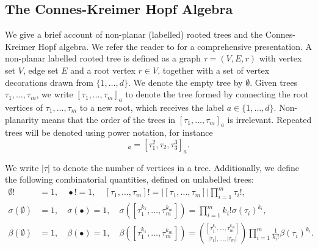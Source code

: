 \documentclass{article} %
\theoremstyle{definition}
\theoremstyle{remark}
\begin{document}
\subsection{The Connes-Kreimer Hopf Algebra}

We give a brief account of non-planar (labelled) rooted trees and the Connes-Kreimer Hopf algebra. We refer the reader to \cite{hoffman2003hopf} for a comprehensive presentation. A non-planar labelled rooted tree is defined as a graph $\tau = (V, E, r)$ with vertex set $V$, edge set $E$ and a root vertex $r \in V$, together with a set of vertex decorations drawn from $\{1, \ldots, d\}$. We denote the empty tree by $\emptyset$. Given trees $\tau_1, \ldots, \tau_m$, we write $[\tau_1, \ldots, \tau_m]_a$ to denote the tree formed by connecting the root vertices of $\tau_1, \ldots, \tau_m$ to a new root, which receives the label $a \in \{1, \ldots, d\}$. Non-planarity means that the order of the trees in $[\tau_1, \ldots, \tau_m]_a$ is irrelevant. Repeated trees will be denoted using power notation, for instance
\begin{equation*}
    [\tau_1,\tau_1, \tau_2, \tau_3, \tau_3, \tau_3]_a = [\tau_1^2, \tau_2, \tau_3^3]_a.
\end{equation*}

We write $|\tau|$ to denote the number of vertices in a tree. Additionally, we define the following combinatorial quantities, defined on unlabelled trees:
\begin{align*}
    \emptyset! &= 1, \quad \bullet! = 1, \quad [\tau_1, \ldots, \tau_m]! = |[\tau_1, \ldots, \tau_m]| \prod_{i=1}^m \tau_i!,\\
    \sigma(\emptyset) &= 1, \quad \sigma(\bullet) = 1, \quad \sigma([\tau_1^{k_1}, \ldots, \tau_m^{k_m}]) = \prod_{i=1}^m k_i! \sigma(\tau_i)^{k_i},\\
    \beta(\emptyset) &= 1, \quad \beta(\bullet) = 1, \quad \beta([\tau_1^{k_1}, \ldots, \tau_m^{k_m}]) = \binom{[\tau_1^{k_1}, \ldots, \tau_m^{k_m}]}{|\tau_1|, \ldots, |\tau_m|}\prod_{i=1}^m \frac{1}{k_i!} \beta(\tau_i)^{k_i}.
\end{align*}
\end{document}
